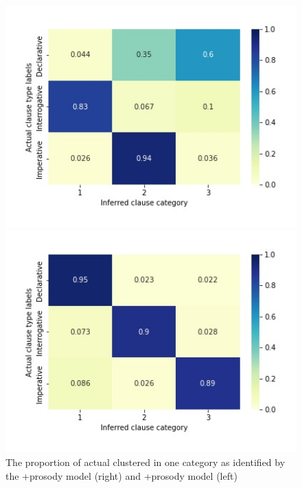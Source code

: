 \begin{figure}[H]
\begin{minipage}[b]{0.45\linewidth}	
    \centering
    \includegraphics[width=1.2\textwidth]{figures/baseline-heatrev-bu.jpg}
\end{minipage}
\begin{minipage}[b]{0.45\linewidth}	
    \centering
    \includegraphics[width=1.2\textwidth]{figures/target-heatrev-bu.jpg}
\end{minipage}   
    \caption{The proportion of actual \diis{} clustered in one category as identified by the \dlearnerabbr{}+prosody model (right) and \plearnerabbr{}+prosody model (left) }
    \label{fig:heatrev-prosody}
\end{figure}

